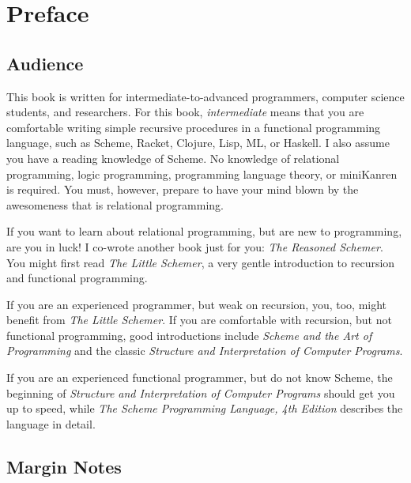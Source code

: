 \chapter{Preface}

\section{Audience}\label{sec:preface:audience}

This\marginnote{}  book is written for
intermediate-to-advanced programmers, computer science students, and
researchers.  For this book, \emph{intermediate} means that you are
comfortable writing simple recursive procedures in a functional
programming language, such as Scheme, Racket, Clojure, Lisp, ML, or
Haskell.  I also assume you have a reading knowledge of Scheme.
%
No knowledge of relational programming, logic programming, programming
language theory, or miniKanren is required.
%
You must, however, prepare to have your mind blown by
the awesomeness that is relational programming.

If you want to learn about relational programming, but are new to
programming, are you in luck!  I co-wrote another book just for you:
\emph{The Reasoned Schemer}\cite{trs}. You might first read \emph{The Little
  Schemer}\cite{Friedman:1996:LS:230223}, a very gentle introduction to recursion and
functional programming.

If you are an experienced programmer, but weak on recursion, you, too, might
benefit from \emph{The Little Schemer}.  If you are comfortable with
recursion, but not functional programming, good introductions include
\emph{Scheme and the Art of Programming}\cite{Springer:1989:Art} and
the classic \emph{Structure and Interpretation of Computer
  Programs}\cite{Abelson:1996:SIC:547755}.

If you are an experienced functional programmer, but do not know
Scheme, the beginning of \emph{Structure and Interpretation of
  Computer Programs} should get you up to speed, while \emph{The
  Scheme Programming Language, 4th Edition}\cite{Dybvig:2009:SPL:1618542} describes the language in detail.


\section{Margin Notes}\label{sec:preface:margin-notes}

